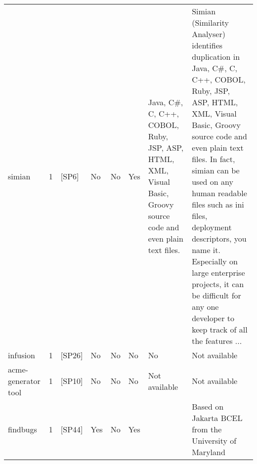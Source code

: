 \begin{tabular}{lrllllll}
              simian &      1 &                                                  [SP6] &    No &       No &       Yes &                                                                         Java, C\#, C, C++, COBOL, Ruby, JSP, ASP, HTML, XML, Visual Basic, Groovy source code and even plain text files. &  Simian (Similarity Analyser) identifies duplication in Java, C\#, C, C++, COBOL, Ruby, JSP, ASP, HTML, XML, Visual Basic, Groovy source code and even plain text files. In fact, simian can be used on any human readable files such as ini files, deployment descriptors, you name it. Especially on large enterprise projects, it can be difficult for any one developer to keep track of all the features ... \\
            infusion &      1 &                                                 [SP26] &    No &       No &        No &                                                                                                                                                                                      No &                                                                                                                                                                                                                                                                                                                                                                                                    Not available \\
 acme-generator tool &      1 &                                                 [SP10] &    No &       No &        No &                                                                                                                                                                           Not available &                                                                                                                                                                                                                                                                                                                                                                                                    Not available \\
            findbugs &      1 &                                                 [SP44] &   Yes &       No &       Yes &                                                                                                                                                                                         &                                                                                                                                                                                                                                                                                                                                                            Based on Jakarta BCEL from the University of Maryland \\

\end{tabular}
